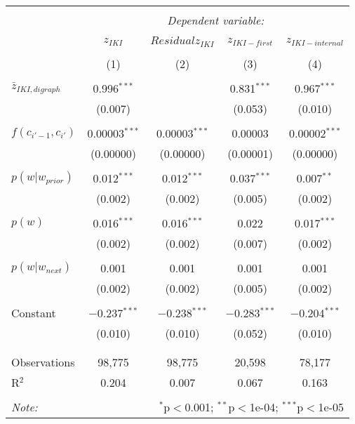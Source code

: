 
\begin{table*}[!htbp] \centering 
  \caption{} 
  \label{} 
\begin{tabular}{@{\extracolsep{5pt}}lcccc} 
\\[-1.8ex]\hline 
\hline \\[-1.8ex] 
 & \multicolumn{4}{c}{\textit{Dependent variable:}} \\ 
\cline{2-5} 
\\[-1.8ex] & $z_{IKI}$ & $Residual z_{IKI}$ & $z_{IKI-first}$ & $z_{IKI-internal}$ \\ 
\\[-1.8ex] & (1) & (2) & (3) & (4)\\ 
\hline \\[-1.8ex] 
 $\bar{z}_{IKI,digraph}$ & 0.996$^{***}$ &  & 0.831$^{***}$ & 0.967$^{***}$ \\ 
  & (0.007) &  & (0.053) & (0.010) \\ 
  & & & & \\ 
 $f(c_{i'-1},c_{i'})$ & 0.00003$^{***}$ & 0.00003$^{***}$ & 0.00003 & 0.00002$^{***}$ \\ 
  & (0.00000) & (0.00000) & (0.00001) & (0.00000) \\ 
  & & & & \\ 
 $p(w|w_{prior})$ & 0.012$^{***}$ & 0.012$^{***}$ & 0.037$^{***}$ & 0.007$^{**}$ \\ 
  & (0.002) & (0.002) & (0.005) & (0.002) \\ 
  & & & & \\ 
 $p(w)$ & 0.016$^{***}$ & 0.016$^{***}$ & 0.022 & 0.017$^{***}$ \\ 
  & (0.002) & (0.002) & (0.007) & (0.002) \\ 
  & & & & \\ 
 $p(w|w_{next})$ & 0.001 & 0.001 & 0.001 & 0.001 \\ 
  & (0.002) & (0.002) & (0.005) & (0.002) \\ 
  & & & & \\ 
 Constant & $-$0.237$^{***}$ & $-$0.238$^{***}$ & $-$0.283$^{***}$ & $-$0.204$^{***}$ \\ 
  & (0.010) & (0.010) & (0.052) & (0.010) \\ 
  & & & & \\ 
\hline \\[-1.8ex] 
Observations & 98,775 & 98,775 & 20,598 & 78,177 \\ 
R$^{2}$ & 0.204 & 0.007 & 0.067 & 0.163 \\ 
\hline 
\hline \\[-1.8ex] 
\textit{Note:}  & \multicolumn{4}{r}{$^{*}$p$<$0.001; $^{**}$p$<$1e-04; $^{***}$p$<$1e-05} \\ 
\end{tabular} 
\end{table*} 
